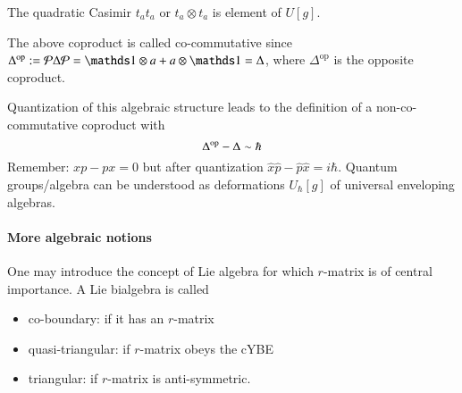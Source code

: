 \begin{example} 
	The quadratic Casimir $t_a t_a$  or $t_a \otimes t_a$ is element of $U[g]$.
\end{example}

The above coproduct is called co-commutative since $\Delta^{\text{op}} := \mathcal{P} \Delta \mathcal{P} = \id \otimes a + a \otimes \id = \Delta$, where $\Delta^{\text{op}}$ is the opposite coproduct.

Quantization of this algebraic structure leads to the definition of a non-co-commutative coproduct with 
\begin{equation*}
	\Delta^{\text{op}} - \Delta \sim \hbar
\end{equation*}
Remember: $xp - px = 0$ but after quantization $\hat{x} \hat{p} - \hat{p} \hat{x} = i \hbar$. Quantum groups/algebra can be understood as deformations $U_\hbar [g]$ of universal enveloping algebras.

\paragraph{More algebraic notions}
One may introduce the concept of Lie algebra for which $r$-matrix is of central importance. A Lie bialgebra is called 
\begin{itemize}
	\item  co-boundary: if it has an $r$-matrix
	\item quasi-triangular: if $r$-matrix obeys the cYBE
	\item triangular: if $r$-matrix is anti-symmetric.
\end{itemize}
